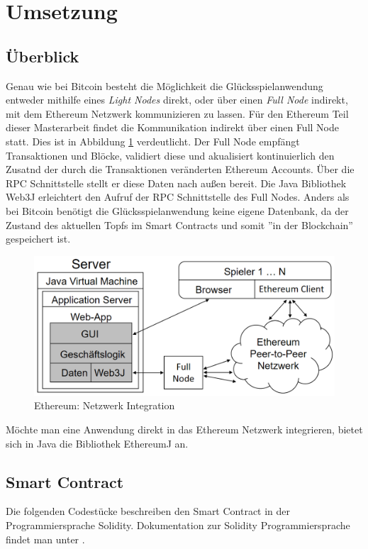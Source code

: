 \section{Umsetzung}
\subsection{Überblick}
Genau wie bei Bitcoin besteht die Möglichkeit die Glücksspielanwendung entweder mithilfe eines \textit{Light Nodes} direkt, oder über einen \textit{Full Node} indirekt, mit dem Ethereum Netzwerk kommunizieren zu lassen. Für den Ethereum Teil dieser Masterarbeit findet die Kommunikation indirekt über einen Full Node statt. Dies ist in Abbildung \ref{fig:eth_anwendung_aufbau} verdeutlicht. Der Full Node empfängt Transaktionen und Blöcke, validiert diese und akualisiert kontinuierlich den Zusatnd der durch die Transaktionen veränderten Ethereum Accounts. Über die RPC Schnittstelle stellt er diese Daten nach außen bereit. Die Java Bibliothek Web3J \cite{web3j} erleichtert den Aufruf der RPC Schnittstelle des Full Nodes. Anders als bei Bitcoin benötigt die Glücksspielanwendung keine eigene Datenbank, da der Zustand des aktuellen Topfs im Smart Contracts und somit ''in der Blockchain'' gespeichert ist.
\begin{figure}[H]
\centering
\includegraphics[width=1\linewidth]{Figures/umsetzung_eth/anwendung_aufbau}
\decoRule
\caption{Ethereum: Netzwerk Integration}
\label{fig:eth_anwendung_aufbau}
\end{figure}

Möchte man eine Anwendung direkt in das Ethereum Netzwerk integrieren, bietet sich in Java die Bibliothek EthereumJ \cite{ethereumj} an. 

\subsection{Smart Contract}
Die folgenden Codestücke beschreiben den  Smart Contract in der Programmiersprache Solidity. Dokumentation zur Solidity Programmiersprache findet man unter \cite{doc_solidity}.

